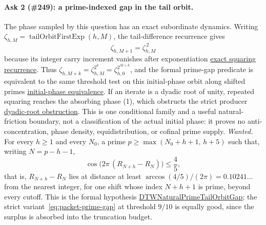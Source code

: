 \documentclass[11pt]{article}
\newcommand{\commit}{bb4e24651b37cd096d3749ef299c3317930b3a3b}
\newcommand{\repobase}{https://github.com/wcook04/plectis-lean-erdos249-257/blob/\commit}
\newcommand{\rootbase}{https://github.com/wcook04/plectis-lean-erdos249-257/blob/\commit}
\newcommand{\PK}{Erdos249257}
\newcommand{\lword}[4]{\href{\repobase/\PK/#1\#L#2}{#4}}
\newcommand{\rootword}[4]{\href{\rootbase/#1\#L#2}{#4}}
\theoremstyle{definition}
\theoremstyle{remark}
\begin{document}
\paragraph{Ask 2 (\#249): a prime-indexed gap in the tail orbit.}
The phase sampled by this question has an exact subordinate dynamics.  Writing
\(\zeta_{h,M}=\operatorname{tailOrbitFirstExp}(h,M)\), the tail-difference
recurrence gives
\[
  \zeta_{h,M+1}=\zeta_{h,M}^{\,2}
\]
because its integer carry increment vanishes after exponentiation
\rootword{ErdosProblems/Erdos249/TotientStrictPrimeEscape.lean}{167}{tailOrbitFirstExp_succ}{exact squaring recurrence}.
Thus
\(\zeta_{h,M+k}=\zeta_{h,M}^{2^k}=\zeta_{h,0}^{2^{M+k}}\), and the formal
prime-gap predicate is equivalent to the same threshold test on this
initial-phase orbit along shifted primes
\rootword{ErdosProblems/Erdos249/TotientStrictPrimeEscape.lean}{278}{naturalPrimeTailOrbitStrictGap_iff_initial_phase}{initial-phase equivalence}.
If an iterate is a dyadic root of unity, repeated squaring reaches the
absorbing phase (1), which obstructs the strict producer
\rootword{ErdosProblems/Erdos249/TotientStrictPrimeEscape.lean}{322}{not_naturalPrimeTailOrbitStrictGap_of_dyadic_root}{dyadic-root obstruction}.
This is one conditional family and a useful natural-friction boundary, not a
classification of the actual initial phase: it proves no anti-concentration,
phase density, equidistribution, or cofinal prime supply.
\emph{Wanted.}  For every \(h\ge1\) and every \(N_0\), a prime
\(p\ge\max(N_0+h+1,\,h+5)\) such that, writing \(N=p-h-1\),
\[
 \cos\bigl(2\pi\,(R_{N+h}-R_N)\bigr)\le\frac45,
\]
that is, \(R_{N+h}-R_N\) lies at distance at least
\(\arccos(4/5)/(2\pi)=0.10241\ldots\) from the nearest integer, for one shift
whose index \(N+h+1\) is prime, beyond every cutoff.  This is the formal
hypothesis
\lword{PivotAntiReconstruction.lean}{1256}{DTWNaturalPrimeTailOrbitGap}{DTWNaturalPrimeTailOrbitGap};
the strict variant~\eqref{eq:packet-prime-gap} at threshold \(9/10\) is
equally good, since the surplus is absorbed into the truncation budget.
\end{document}
